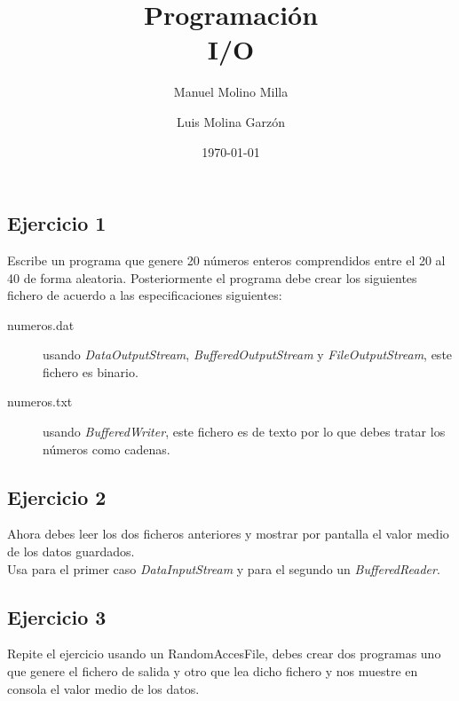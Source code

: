 \documentclass[4paper]{article}
\author{Manuel Molino Milla \and Luis Molina Garzón}
\title{\textbf{Programación}
\\I/O}
\date{\today}
\begin{document}
\maketitle

\subsection*{Ejercicio 1}
Escribe un programa que genere 20 números enteros comprendidos entre el 20 al 40 de forma aleatoria. Posteriormente el programa debe crear los siguientes fichero de acuerdo a las especificaciones siguientes:
\begin{description}
\item[numeros.dat] usando \emph{DataOutputStream}, \emph{BufferedOutputStream} y \emph{FileOutputStream}, este fichero es binario.
\item[numeros.txt] usando \emph{BufferedWriter}, este fichero es de texto por lo que debes tratar los números como cadenas.
\end{description}

\subsection*{Ejercicio 2}
Ahora debes leer los dos ficheros anteriores y mostrar por pantalla el valor medio de los datos guardados. \\
Usa para el primer caso \emph{DataInputStream} y para el segundo un \emph{BufferedReader}.

\subsection*{Ejercicio 3}
Repite el ejercicio usando un RandomAccesFile, debes crear dos programas uno que genere el fichero de salida y otro que lea dicho fichero y nos muestre en consola el valor medio de los datos.
\end{document}
